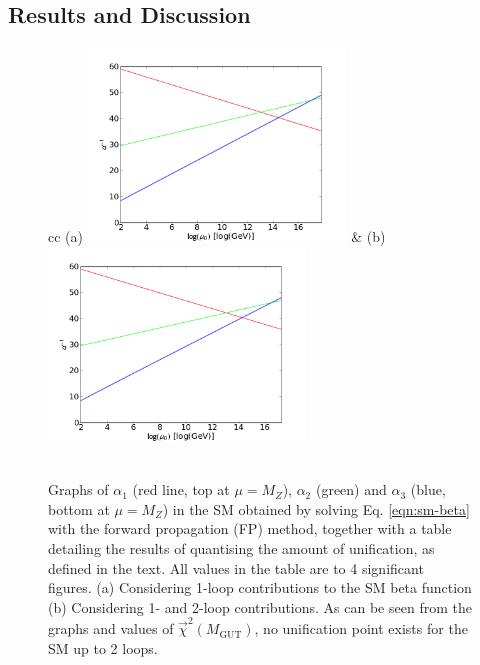 \documentclass[12pt,a4paper,oneside]{article}
\begin{document}
\subsection{Results and Discussion}

\begin{figure}[th]
\begin{center}
\begin{tabular}{cc}
(a) \includegraphics[width=6.85cm]{figs/sm-1loop.png} & (b) \includegraphics[width=6.85cm]{figs/sm-2loop.png} \\
\\

\end{tabular}

\caption[]{Graphs of $\alpha_1$ (red line, top at $\mu = M_Z$), $\alpha_2$ (green) and $\alpha_3$ (blue, bottom at $\mu = M_Z$) in the SM obtained by solving Eq. \ref{eqn:sm-beta} with the forward propagation (FP) method, together with a table detailing the results of quantising the amount of unification, as defined in the text. All values in the table are to 4 significant figures. (a) Considering 1-loop contributions to the SM beta function (b) Considering 1- and 2-loop contributions. As can be seen from the graphs and values of $\overrightarrow{\chi}^2 (M_\mathrm{GUT})$, no unification point exists for the SM up to 2 loops.}
\label{fig:sm}
\end{center}
\end{figure}
\end{document}
